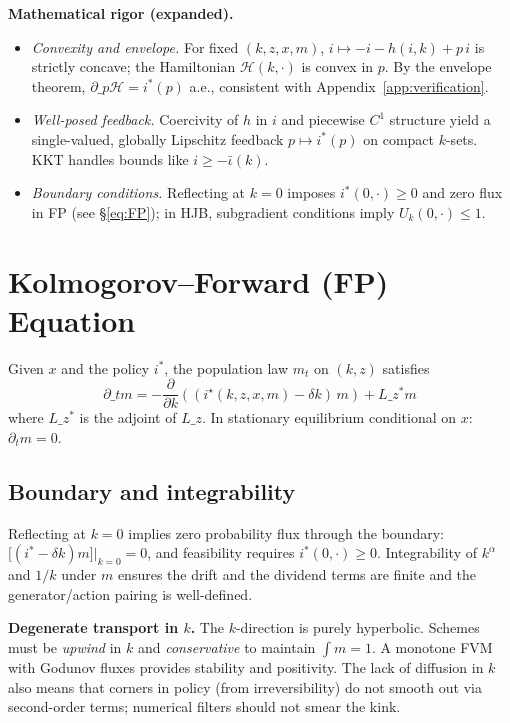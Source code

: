 ﻿\documentclass[11pt,letterpaper,oneside]{article}
\numberwithin{equation}{section}
\newcommand{\ac}[1]{{\mdseries\textsc{#1}}}
\newcommand{\1}{\mathbf{1}}
\newcommand{\Lz}{L\_z}
\newcommand{\Lzadj}{L\_z^{\!*}}
\newcommand{\kbar}{\bar\iota}
\begin{document}
\begin{tcolorbox}[mathstyle]
\textbf{Mathematical rigor (expanded).}
\begin{itemize}[leftmargin=1.15em,itemsep=0.25em]
  \item \emph{Convexity and envelope.} For fixed $(k,z,x,m)$, $i\mapsto -i-h(i,k)+p\,i$ is strictly concave; the Hamiltonian $\mathcal H(k,\cdot)$ is convex in $p$. By the envelope theorem, $\partial\_p\mathcal H=i^*(p)$ a.e., consistent with Appendix~\ref{app:verification}.
  \item \emph{Well-posed feedback.} Coercivity of $h$ in $i$ and piecewise $C^1$ structure yield a single-valued, globally Lipschitz feedback $p\mapsto i^*(p)$ on compact $k$-sets. KKT handles bounds like $i\ge-\kbar(k)$.
  \item \emph{Boundary conditions.} Reflecting at $k=0$ imposes $i^*(0,\cdot)\ge0$ and zero flux in FP (see \S\ref{eq:FP}); in HJB, subgradient conditions imply $U_k(0,\cdot)\le1$.
\end{itemize}
\end{tcolorbox}

\section{Kolmogorov--Forward (FP) Equation}

Given $x$ and the policy $i^*$, the population law $m_t$ on $(k,z)$ satisfies
\begin{equation}
\partial\_t m = -\frac{\partial}{\partial k}\left((i^\star(k,z,x,m)-\delta k)\, m\right) + \Lzadj m
\tag{FP}\label{eq:FP}
\end{equation}
where $\Lzadj$ is the adjoint of $\Lz$. In stationary equilibrium conditional on $x$: $\partial_t m=0$.

\subsection{Boundary and integrability}
Reflecting at $k=0$ implies zero probability flux through the boundary:
$\big[(i^*-\delta k)m\big]\big|_{k=0}=0$,
and feasibility requires $i^*(0,\cdot)\ge 0$. Integrability of $k^\alpha$ and $1/k$ under $m$ ensures the drift and the dividend terms are finite and the generator/action pairing is well-defined.

\begin{tcolorbox}[mathstyle]
\textbf{Degenerate transport in $k$.} The $k$-direction is purely hyperbolic. Schemes must be \emph{upwind} in $k$ and \emph{conservative} to maintain $\int m=1$. A monotone \ac{FVM} with Godunov fluxes provides stability and positivity. The lack of diffusion in $k$ also means that corners in policy (from irreversibility) do not smooth out via second-order terms; numerical filters should not smear the kink.
\end{tcolorbox}
\end{document}
